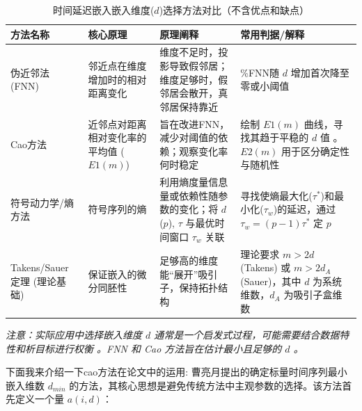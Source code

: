 \begin{table}[h!] %
    \centering %
    \caption{时间延迟嵌入嵌入维度($d$)选择方法对比（不含优点和缺点）}
    \label{tab:embedding_dimension_methods_no_pros_cons}
    \begin{tabular}{
      >{\raggedright\arraybackslash}m{3cm} %
      >{\raggedright\arraybackslash}m{4.5cm} %
      >{\raggedright\arraybackslash}m{5cm}  %
      >{\raggedright\arraybackslash}m{4cm}  %
    }
    \toprule %
    \textbf{方法名称} & \textbf{核心原理}  & \textbf{原理阐释}  & \textbf{常用判据/解释} \\
    \midrule %
    
    伪近邻法 (FNN) \cite{rhodes1997false}& 邻近点在维度增加时的相对距离变化  & 维度不足时，投影导致假邻居；维度足够时，假邻居会散开，真邻居保持靠近  & \%FNN随 $d$ 增加首次降至零或小阈值  \\
    \addlinespace %
    
    Cao方法\cite{cao1997practical} & 近邻点对距离相对变化率的平均值 ($E1(m)$)  & 旨在改进FNN，减少对阈值的依赖；观察变化率何时稳定  & 绘制 $E1(m)$ 曲线，寻找其趋于平稳的 $d$ 值 。$E2(m)$ 用于区分确定性与随机性  \\
    \addlinespace
    
    符号动力学/熵方法 & 符号序列的熵  & 利用熵度量信息量或依赖性随参数的变化；将 $d$ ($p$), $τ$ 与最优时间窗口 $\tau_w$ 关联  & 寻找使熵最大化($\tau^*$)和最小化($\tau_w$)的延迟，通过 $\tau_w=(p-1)\tau^*$ 定 $p$  \\
    \addlinespace
    
    Takens/Sauer 定理 (理论基础) & 保证嵌入的微分同胚性  & 足够高的维度能“展开”吸引子，保持拓扑结构  & 理论要求 $m > 2d$ (Takens) 或 $m > 2d_A$ (Sauer)，其中 $d$ 为系统维数，$d_A$ 为吸引子盒维数 \\
    
    \bottomrule %
    \end{tabular}
    \par %
    \vspace{0.5cm} %
    \textit{注意：实际应用中选择嵌入维度 $d$ 通常是一个启发式过程，可能需要结合数据特性和析目标进行权衡 。FNN 和 Cao 方法旨在估计最小且足够的 $d$ 。}
    \end{table}
下面我来介绍一下cao方法在论文中的运用:
曹亮月\cite{cao1997practical}提出的确定标量时间序列最小嵌入维数 $d_{min}$ 的方法，其核心思想是避免传统方法中主观参数的选择。该方法首先定义一个量 $a(i,d)$：
